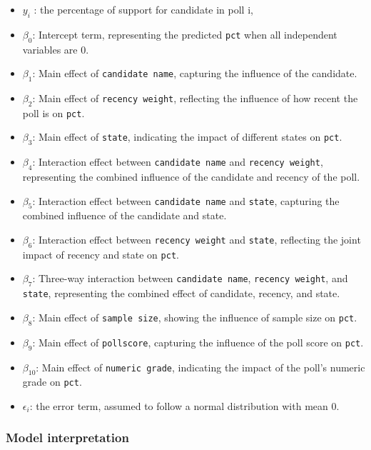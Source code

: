 \documentclass[
  letterpaper,
  DIV=11,
  numbers=noendperiod]{scrartcl}
\providecommand{\tightlist}{%
  \setlength{\itemsep}{0pt}\setlength{\parskip}{0pt}}\usepackage{longtable,booktabs,array}
\begin{document}
\begin{itemize}
\tightlist
\item
  \(y_i\) : the percentage of support for candidate in poll i,
\item
  \(\beta_0\): Intercept term, representing the predicted \texttt{pct}
  when all independent variables are 0.
\item
  \(\beta_1\): Main effect of \texttt{candidate\ name}, capturing the
  influence of the candidate.
\item
  \(\beta_2\): Main effect of \texttt{recency\ weight}, reflecting the
  influence of how recent the poll is on \texttt{pct}.
\item
  \(\beta_3\): Main effect of \texttt{state}, indicating the impact of
  different states on \texttt{pct}.
\item
  \(\beta_4\): Interaction effect between \texttt{candidate\ name} and
  \texttt{recency\ weight}, representing the combined influence of the
  candidate and recency of the poll.
\item
  \(\beta_5\): Interaction effect between \texttt{candidate\ name} and
  \texttt{state}, capturing the combined influence of the candidate and
  state.
\item
  \(\beta_6\): Interaction effect between \texttt{recency\ weight} and
  \texttt{state}, reflecting the joint impact of recency and state on
  \texttt{pct}.
\item
  \(\beta_7\): Three-way interaction between \texttt{candidate\ name},
  \texttt{recency\ weight}, and \texttt{state}, representing the
  combined effect of candidate, recency, and state.
\item
  \(\beta_8\): Main effect of \texttt{sample\ size}, showing the
  influence of sample size on \texttt{pct}.
\item
  \(\beta_9\): Main effect of \texttt{pollscore}, capturing the
  influence of the poll score on \texttt{pct}.
\item
  \(\beta_{10}\): Main effect of \texttt{numeric\ grade}, indicating the
  impact of the poll's numeric grade on \texttt{pct}.
\item
  \(\epsilon_i\): the error term, assumed to follow a normal
  distribution with mean 0.
\end{itemize}

\hypertarget{model-interpretation}{%
\subsubsection{Model interpretation}\label{model-interpretation}}
\end{document}
